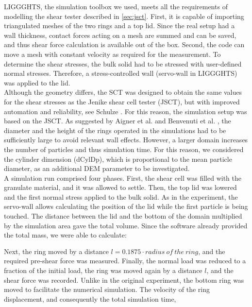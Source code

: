 \acs{LIGGGHTS}, the simulation toolbox we used, meets all the requirements of
modelling the shear tester described in \ref{sec:jsct}. 
First, it is capable of importing triangulated meshes of the two rings and a top lid. 
Since the real setup had a wall thickness, contact forces acting on a mesh are summed and can be saved, 
and thus shear force calculation is available out of the box. 
Second, the code can move a mesh with constant 
velocity as required for the measurement. 
To determine the shear stresses, the bulk solid had to be stressed with 
user-defined normal stresses. 
Therefore, a stress-controlled wall (servo-wall in \acs{LIGGGHTS}) was applied to the lid. \\
Although the geometry differs, the \acs{SCT} was designed to obtain the same values for the shear stresses as the 
Jenike shear cell tester (\acs{JSCT}), but with improved automation and reliability,
see Schulze \cite{RefWorks:118}. 
For this reason, the simulation setup was
based on the \acs{JSCT}.
As suggested by Aigner et al. \cite{RefWorks:139} and Benvenuti et al. \cite{RefWorks:173}, 
the diameter and the height of the rings operated in the simulations had to be sufficiently large to avoid relevant wall effects. 
However, a larger domain increases the number of particles and thus
simulation time.
For this reason, we considered the cylinder dimension (\acs{dCylDp}), which is
proportional to the mean particle diameter, as an additional \acs{DEM}
parameter to be investigated. \\
A simulation run comprised four phases. 
First, the shear cell was filled with the granulate material, and it was allowed
to settle.
Then, the top lid was lowered and the first normal stress applied to the bulk
solid.
As in the experiment, the servo-wall allows calculating the position of the lid
while the first particle is being touched. 
The distance between the lid and the bottom of the domain multiplied by the 
simulation area gave the total volume.
Since the software already provided the total mass, we were able to calculate:

Next, the ring moved by a distance $l=0.1875 \cdot radius ~of ~the ~ring$, and
the required pre-shear force was measured.
Finally, the normal load was reduced to a fraction of the initial load, 
the ring was moved again by a distance $l$, and the shear force was recorded. 
Unlike in the original experiment, the bottom ring was moved to facilitate the numerical simulation. 
The velocity of the ring displacement, and consequently the total simulation time, 
